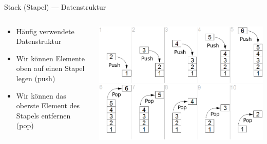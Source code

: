 \documentclass[presentation]{beamer}
\begin{document}
\begin{frame}[label={sec:org01f9449}]{Stack (Stapel) --- Datenstruktur}
\begin{columns}
\begin{column}{0.4\columnwidth}
\begin{itemize}
\item Häufig verwendete Datenstruktur
\item Wir können Elemente oben auf einen Stapel legen (push)
\item Wir können das oberste Element des Stapels entfernen (pop)
\end{itemize}
\end{column}
\begin{column}{0.6\columnwidth}
\begin{center}\begin{center}
\includegraphics[width=.9\linewidth]{images/Lifo_stack.png}
\end{center}\end{center}
\end{column}
\end{columns}
\end{frame}
\end{document}
